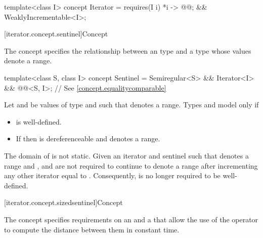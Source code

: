 %
\begin{codeblock}
template<class I>
  concept Iterator =
    requires(I i) {
      { *i } -> @@;
    } &&
    WeaklyIncrementable<I>;
\end{codeblock}

[iterator.concept.sentinel]{Concept }

\pnum
The  concept specifies the relationship
between an  type and a  type
whose values denote a range.

%
\begin{itemdecl}
template<class S, class I>
  concept Sentinel =
    Semiregular<S> &&
    Iterator<I> &&
    @@<S, I>; // See \ref{concept.equalitycomparable}
\end{itemdecl}

\begin{itemdescr}
\pnum
Let  and  be values of type  and
 such that  denotes a range. Types
 and  model  only if

\begin{itemize}
\item {} is well-defined.

\item If  then  is dereferenceable and
       denotes a range.
\end{itemize}
\end{itemdescr}

\pnum
The domain of \tcode{==} is not static.
Given an iterator  and sentinel  such that 
denotes a range and ,  and  are not required to
continue to denote a range after incrementing any other iterator equal
to . Consequently,  is no longer required to be
well-defined.

[iterator.concept.sizedsentinel]{Concept }

\pnum
The  concept specifies
requirements on an  and a 
that allow the use of the \tcode{-} operator to compute the distance
between them in constant time.

%

